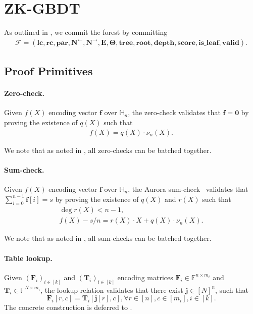 \section{ZK-GBDT}\label{sec:zkgbdt-protocol}

As outlined in ,
    we commit the forest by committing
    \begin{align}
        \mathcal{F} = (\mathbf{lc}, \mathbf{rc}, \mathbf{par}, \mathbf{N}^{\leftarrow}, \mathbf{N}^{\rightarrow}, \mathbf{E}, \boldsymbol{\Theta}, \mathbf{tree}, \mathbf{root}, \mathbf{depth}, \mathbf{score}, \mathbf{is\_leaf}, \mathbf{valid}).
    \end{align}

\subsection{Proof Primitives}
\paragraph{Zero-check.}
Given $f(X)$ encoding vector $\mathbf{f}$ over $\mathbb{H}_n$,
    the zero-check validates that $\mathbf{f} = \mathbf{0}$ by proving the existence of $q(X)$ such that
    \begin{align}
        f(X) = q(X)\cdot \nu_n(X).
    \end{align}

We note that as noted in , all zero-checks can be batched together.
    
\paragraph{Sum-check.}
Given $f(X)$ encoding vector $\mathbf{f}$ over $\mathbb{H}_n$,
    the Aurora sum-check~\cite{aurora19} validates that $\sum_{i=0}^{n-1} \mathbf{f}[i] = s$ by proving the existence of $q(X)$
    and $r(X)$ such that
    \begin{align}
        \deg r(X) < n-1, \\
        f(X) - s/n = r(X) \cdot X + q(X)\cdot \nu_n(X).
    \end{align}
    
We note that as noted in , all sum-checks can be batched together.

\paragraph{Table lookup.}
Given $(\mathbf{F}_i)_{i\in [k]}$ and $(\mathbf{T}_i)_{i\in [k]}$
    encoding matrices $\mathbf{F}_i\in \mathbb{F}^{n\times m_i}$
    and $\mathbf{T}_i\in \mathbb{F}^{N\times m_i}$,
    the lookup relation validates that there exist
    $\mathbf{j}\in [N]^n$, such that
    \[
        \mathbf{F}_i[r, c] = \mathbf{T}_i[\mathbf{j}[r], c], \forall r\in [n], c\in [m_i], i\in [k].
    \]
    The concrete construction
    is deferred to .


